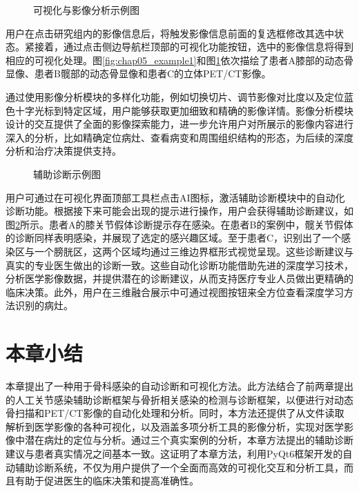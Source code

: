 \begin{figure}[t]
    \centering
    \hfill
    \caption{可视化与影像分析示例图}
    \label{fig:chap05_example2}
\end{figure}

用户在点击研究组内的影像信息后，将触发影像信息前面的复选框修改其选中状态。紧接着，通过点击侧边导航栏顶部的可视化功能按钮，选中的影像信息将得到相应的可视化处理。图\ref{fig:chap05_example1}和图\ref{fig:chap05_example2}依次描绘了患者A膝部的动态骨显像、患者B髋部的动态骨显像和患者C的立体PET/CT影像。

通过使用影像分析模块的多样化功能，例如切换切片、调节影像对比度以及定位蓝色十字光标到特定区域，用户能够获取更加细致和精确的影像详情。影像分析模块设计的交互提供了全面的影像探索能力，进一步允许用户对所展示的影像内容进行深入的分析，比如精确定位病灶、查看病变和周围组织结构的形态，为后续的深度分析和治疗决策提供支持。

\begin{figure}[b]
    \centering
    \hfill
    \newline
    \hfill
    \caption{辅助诊断示例图}\label{fig:chap05_result}
\end{figure}

用户可通过在可视化界面顶部工具栏点击AI图标，激活辅助诊断模块中的自动化诊断功能。根据接下来可能会出现的提示进行操作，用户会获得辅助诊断建议，如图\ref{fig:chap05_result}所示。患者A的膝关节假体诊断提示存在感染。在患者B的案例中，髋关节假体的诊断同样表明感染，并展现了选定的感兴趣区域。至于患者C，识别出了一个感染区与一个膀胱区，这两个区域均通过三维边界框形式视觉呈现。这些诊断建议与真实的专业医生做出的诊断一致。这些自动化诊断功能借助先进的深度学习技术，分析医学影像数据，并提供潜在的诊断建议，从而支持医疗专业人员做出更精确的临床决策。此外，用户在三维融合展示中可通过视图按钮来全方位查看深度学习方法识别的病灶。

\section{本章小结}

本章提出了一种用于骨科感染的自动诊断和可视化方法。此方法结合了前两章提出的人工关节感染辅助诊断框架与骨折相关感染的检测与诊断框架，以便进行对动态骨扫描和PET/CT影像的自动化处理和分析。同时，本方法还提供了从文件读取解析到医学影像的各种可视化，以及涵盖多项分析工具的影像分析，实现对医学影像中潜在病灶的定位与分析。通过三个真实案例的分析，本章方法提出的辅助诊断建议与患者真实情况之间基本一致。这证明了本章方法，利用PyQt6框架开发的自动辅助诊断系统，不仅为用户提供了一个全面而高效的可视化交互和分析工具，而且有助于促进医生的临床决策和提高准确性。